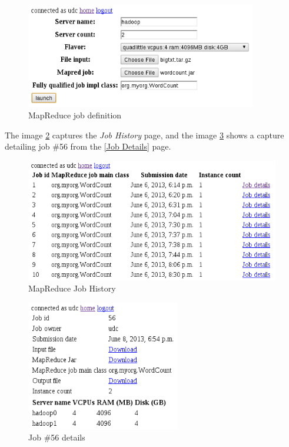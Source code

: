\begin{figure}[bp]
\begin{center}
\includegraphics[width=0.90\textwidth]{imagenes/046.png}
\caption{MapReduce job definition}
\label{fig:defmapredjob}
\end{center}
\end{figure}

The image \ref{fig:mapredjobhistory} captures the \emph{Job History} page, and the image \ref{fig:mapredjobdetails} shows a capture detailing job \#56 from the \ref{Job Details} page.

\begin{figure}[tbp]
\begin{center}
\includegraphics[width=0.99\textwidth]{imagenes/047.png}
\caption{MapReduce Job History}
\label{fig:mapredjobhistory}
\end{center}
\end{figure}

\begin{figure}[tbp]
\begin{center}
\includegraphics[width=0.60\textwidth]{imagenes/048.png}
\caption{Job \#56 details}
\label{fig:mapredjobdetails}
\end{center}
\end{figure}

